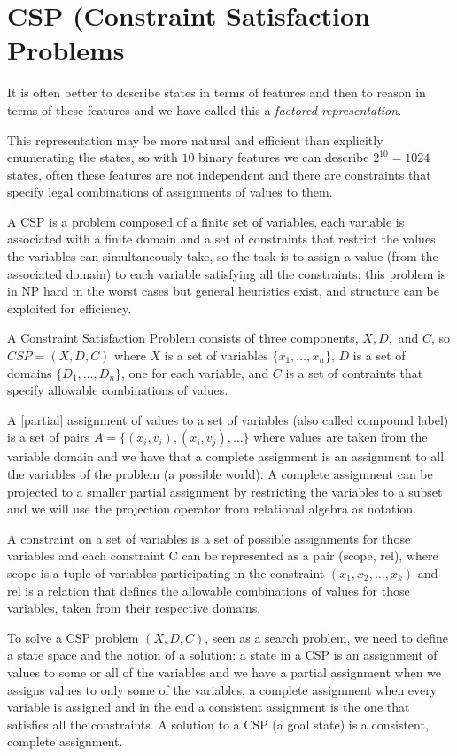 \chapter{CSP (Constraint Satisfaction Problems}
It is often better to describe states in terms of features and then to reason in terms of these features and we have called this a \emph{factored representation}.

This representation may be more natural and efficient than explicitly enumerating the states, so with $10$ binary features we can describe $2^10 = 1024$ states,
often these features are not independent and there are constraints that specify legal combinations of assignments of values to them.

A CSP is a problem composed of a finite set of variables, each variable is associated with a finite domain and a set of constraints that restrict the values
the variables can simultaneously take, so the task is to assign a value (from the associated domain) to each variable satisfying all the constraints;
this problem is in NP hard in the worst cases but general heuristics exist, and structure can be exploited for efficiency.

A Constraint Satisfaction Problem consists of three components, $X, D,$ and $C$, so $CSP = (X, D, C)$ where 
$X$ is a set of variables $\{x_1, \dots, x_n\}$, $D$ is a set of domains $\{D_1, \dots, D_n\}$, one for each variable, and 
$C$ is a set of contraints that specify allowable combinations of values.

A [partial] assignment of values to a set of variables (also called compound label) is a set of pairs $A = \{(x_i, v_i), (x_i, v_j), \dots\}$
where values are taken from the variable domain and we have that a complete assignment is an assignment to all the variables of the problem (a possible world).\newline
A complete assignment can be projected to a smaller partial assignment by restricting the variables to a subset and we will use the projection operator 
from relational algebra as notation.

A constraint on a set of variables is a set of possible assignments for those variables and each constraint C can be represented as a pair (scope, rel), 
where scope is a tuple of variables participating in the constraint $(x_1, x_2, \dots, x_k)$ and rel is a relation that defines the allowable combinations 
of values for those variables, taken from their respective domains.

To solve a CSP problem $(X, D, C)$, seen as a search problem, we need to define a state space and the notion of a solution:
a state in a CSP is an assignment of values to some or all of the variables and we have a partial assignment when we assigns values to only some of the variables,
a complete assignment when every variable is assigned and in the end a consistent assignment is the one that satisfies all the constraints.\newline
A solution to a CSP (a goal state) is a consistent, complete assignment.

